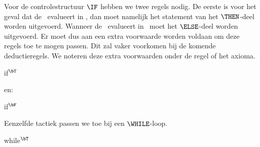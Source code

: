 Voor de controlestructuur $\IF$ hebben we twee regels nodig. De eerste is voor het geval dat de \BExpr\ evalueert in \bT, dan moet namelijk het statement van het $\THEN$-deel worden uitgevoerd. Wanneer de \BExpr\ evalueert in \bF\ moet het $\ELSE$-deel worden uitgevoerd.
Er moet dus aan een extra voorwaarde worden voldaan om deze regels toe te mogen passen. Dit zal vaker voorkomen bij de komende deductieregels. We noteren deze extra voorwaarden onder de regel of het axioma.

\begin{NSAxiom}{if$^\bT$}
  \begin{prooftree}
  \end{prooftree}
  \begin{NSConditions}
  \end{NSConditions}
\end{NSAxiom}

en:

\begin{NSAxiom}{if$^\bF$}
  \begin{prooftree}
  \end{prooftree}
  \begin{NSConditions}
  \end{NSConditions}
\end{NSAxiom}

Eenzelfde tactiek passen we toe bij een $\WHILE$-loop.

\begin{NSAxiom}{while$^\bT$}
  \begin{prooftree}
  \end{prooftree}
  \begin{NSConditions}
  \end{NSConditions}
\end{NSAxiom}

